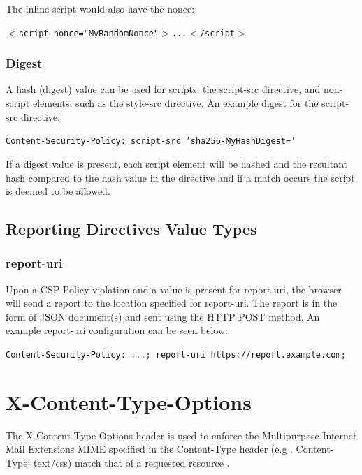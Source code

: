 \documentclass{mscreport}
\begin{document}
\vspace{0.3cm}
\noindent
The inline script would also have the nonce:

\vspace{0.3cm}
\noindent
\texttt{$<$script nonce="MyRandomNonce"$>$...$<$/script$>$}


\subsubsection{Digest}

A hash (digest) value can be used for scripts, the script-src directive, and non-script elements, such as the style-src directive. An example digest for the script-src directive:

\vspace{0.3cm}
\noindent
\texttt{Content-Security-Policy: script-src 'sha256-MyHashDigest='}

\vspace{0.3cm}
\noindent
If a digest value is present, each script element will be hashed and the resultant hash compared to the hash value in the directive and if a match occurs the script is deemed to be allowed.

\subsection{Reporting Directives Value Types}

\subsubsection{report-uri}
Upon a CSP Policy violation and a value is present for report-uri, the browser will send a report to the location specified for report-uri. The report is in the form of JSON document(s) and sent using the HTTP POST method. An example report-uri configuration can be seen below:

\vspace{0.3cm}
\noindent
\texttt{Content-Security-Policy: ...; report-uri https://report.example.com;}

\newpage

\section{X-Content-Type-Options}

The X-Content-Type-Options header is used to enforce the Multipurpose Internet Mail Extensions MIME specified in the Content-Type header (e.g . Content-Type: text/css) match that of a requested resource \cite{Apple_undated-hz}.
\end{document}

